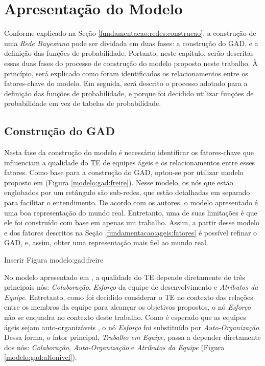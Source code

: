 \chapter{Apresentação do Modelo}
\label{modelo}

Conforme explicado na Seção \ref{fundamentacao:redes:construcao}, a construção de uma \textit{Rede Bayesiana} pode ser dividada em duas fases: a construção do GAD, e a definição das funções de probabilidade. Portanto, neste capítulo, serão descritas essas duas fases do processo de construção do modelo proposto neste trabalho. À princípio, será explicado como foram identificados os relacionamentos entre os fatores-chave do modelo. Em seguida, será descrito o processo adotado para a definição das funções de probabilidade, e porque foi decidido utilizar funções de probabilidade em vez de tabelas de probabilidade.

\section{Construção do GAD}
\label{modelo:gad}

Nesta fase da construção do modelo é necessário identificar os fatores-chave que influenciam a qualidade do TE de equipes ágeis e os relacionamentos entre esses fatores. Como base para a construção do GAD, optou-se por utilizar modelo proposto em \cite{freire} (Figura \ref{modelo:gad:freire}). Nesse modelo, os nós que estão englobados por um retângulo são sub-redes, que estão detalhadas em separado para facilitar o entendimento. De acordo com os autores, o modelo apresentado é uma boa representação do mundo real. Entretanto, uma de suas limitações é que ele foi construído com base em apenas um trabalho. Assim, a partir desse modelo e dos fatores descritos na Seção \ref{fundamentacao:ageis:fatores} é possível refinar o GAD, e, assim, obter uma representação mais fiel ao mundo real.

{\color{red} Inserir Figura modelo:gad:freire}

No modelo apresentado em \cite{freire}, a qualidade do TE depende diretamente de três principais nós: \textit{Colaboração}, \textit{Esforço} da equipe de desenvolvimento e \textit{Atributos da Equipe}. Entretanto, como foi decidido considerar o TE no contexto das relações entre os membros da equipe para alcançar os objetivos propostos, o nó \textit{Esforço} não se enquadra no contexto deste trabalho. Como é esperado que as equipes ágeis sejam auto-organizáveis \cite{manifesto}, o nó \textit{Esforço} foi substituído por \textit{Auto-Organização}. Dessa forma, o fator principal, \textit{Trabalho em Equipe}, passa a depender diretamente dos nós: \textit{Colaboração}, \textit{Auto-Organização} e \textit{Atributos da Equipe} (Figura \ref{modelo:gad:altonivel}).

